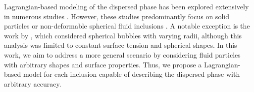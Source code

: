 Lagrangian-based modeling of the dispersed phase has been explored extensively in numerous studies \citep{buyevich1979flow, lhuillier1992volume, simonin1996, zhang1994averaged, zhang1994ensemble, zhang1997momentum, jackson1997locally, zaepffel2011modelisation}. However, these studies predominantly focus on solid particles \citep{buyevich1979flow, lhuillier1992volume, simonin1996, zhang1994averaged, jackson1997locally} or non-deformable spherical fluid inclusions \citep{zhang1994ensemble, zaepffel2011modelisation}. A notable exception is the work by \citep{zhang1994ensemble}, which considered spherical bubbles with varying radii, although this analysis was limited to constant surface tension and spherical shapes. In this work, we aim to address a more general scenario by considering fluid particles with arbitrary shapes and surface properties. Thus, we propose a Lagrangian-based model for each inclusion capable of describing the dispersed phase with arbitrary accuracy. %

